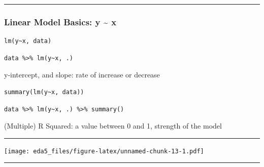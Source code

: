 \documentclass[
]{article}
\begin{document}
\begin{center}\rule{0.5\linewidth}{0.5pt}\end{center}

\hypertarget{linear-model-basics-y-x}{%
\subsubsection{Linear Model Basics: y \textasciitilde{}
x}\label{linear-model-basics-y-x}}

\begin{verbatim}
lm(y~x, data)
\end{verbatim}

\begin{verbatim}
data %>% lm(y~x, .)
\end{verbatim}

y-intercept, and slope: rate of increase or decrease

\begin{verbatim}
summary(lm(y~x, data))
\end{verbatim}

\begin{verbatim}
data %>% lm(y~x, .) %>% summary()
\end{verbatim}

(Multiple) R Squared: a value between 0 and 1, strength of the model

\begin{center}\rule{0.5\linewidth}{0.5pt}\end{center}

\texttt{[image: eda5\_files/figure-latex/unnamed-chunk-13-1.pdf]}

\begin{center}\rule{0.5\linewidth}{0.5pt}\end{center}
\end{document}
